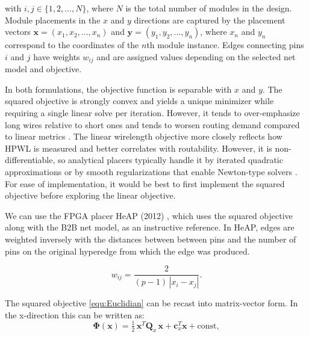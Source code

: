 with $i, j \in \{1, 2, ..., N\}$, where $N$ is the total number of modules in the design.
Module placements in the $x$ and $y$ directions are captured by the placement vectors \( \boldsymbol{x} = (x_1, x_2, ..., x_n) \) and \( \boldsymbol{y} = (y_1, y_2, ..., y_n) \), where $x_n$ and $y_n$ correspond to the coordinates of the $n$th module instance.
Edges connecting pins $i$ and $j$ have weights $w_{ij}$ and are assigned values depending on the selected net model and objective.

In both formulations, the objective function is separable with $x$ and $y$.
The squared objective is strongly convex and yields a unique minimizer while requiring a single linear solve per iteration. 
However, it tends to over-emphasize long wires relative to short ones and tends to worsen routing demand compared to linear metrics \cite{AP_2000}. 
The linear wirelength objective more closely reflects how HPWL is measured and better correlates with routability. 
However, it is non-differentiable, so analytical placers typically handle it by iterated quadratic approximations or by smooth regularizations that enable Newton-type solvers \cite{AP_2000}. 
For ease of implementation, it would be best to first implement the squared objective before exploring the linear objective.

We can use the FPGA placer HeAP (2012) \cite{AP_2012}, which uses the squared objective along with the B2B net model, as an instructive reference.
In HeAP, edges are weighted inversely with the distances between between pins and the number of pins on the original hyperedge from which the edge was produced.

\begin{equation}
    w_{ij} = \frac{2}{(p-1)\,|x_i - x_j|}.
    \label{equ:weight_linearized}
\end{equation}


The squared objective \ref{equ:Euclidian} can be recast into matrix-vector form.
In the x-direction this can be written as:
\begin{equation}
    \boldsymbol{\Phi} (\boldsymbol{x}) 
    = \tfrac{1}{2}\,\boldsymbol{x}^T \boldsymbol{Q}_x\,\boldsymbol{x} + \boldsymbol{c}_x^T \boldsymbol{x} + \text{const},
    \label{equ:quadratic}
\end{equation}

